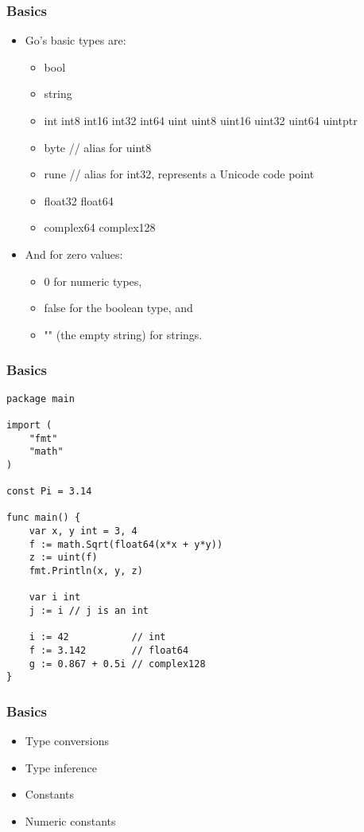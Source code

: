 \begin{frame}
\frametitle{Basics}


\begin{itemize}
	\item Go's basic types are:

	\begin{itemize}
		\item bool
		\item string
		\item int  int8  int16  int32  int64 uint uint8 uint16 uint32 uint64 uintptr
		\item byte // alias for uint8
		\item rune // alias for int32, represents a Unicode code point
		\item float32 float64
		\item complex64 complex128
	\end{itemize}

	\item And for zero values:

	\begin{itemize}
		\item 0 for numeric types,
		\item false for the boolean type, and
		\item "" (the empty string) for strings.
	\end{itemize}
	
\end{itemize}
\end{frame}

\begin{frame}[fragile]
\frametitle{Basics}

\begin{lstlisting}
package main

import (
    "fmt"
    "math"
)

const Pi = 3.14

func main() {
    var x, y int = 3, 4
    f := math.Sqrt(float64(x*x + y*y))
    z := uint(f)
    fmt.Println(x, y, z)

    var i int
    j := i // j is an int

    i := 42           // int
    f := 3.142        // float64
    g := 0.867 + 0.5i // complex128
}

\end{lstlisting}
\end{frame}

\begin{frame}
\frametitle{Basics}

\begin{itemize}
	\item Type conversions
	\item Type inference
	\item Constants
	\item Numeric constants
\end{itemize}

\end{frame}
